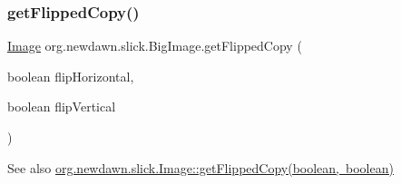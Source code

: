 \subsubsection{\texorpdfstring{get\+Flipped\+Copy()}{getFlippedCopy()}}
{\footnotesize\ttfamily \mbox{\hyperlink{classorg_1_1newdawn_1_1slick_1_1_image}{Image}} org.\+newdawn.\+slick.\+Big\+Image.\+get\+Flipped\+Copy (\begin{DoxyParamCaption}\item[{boolean}]{flip\+Horizontal,  }\item[{boolean}]{flip\+Vertical }\end{DoxyParamCaption})\hspace{0.3cm}{\ttfamily [inline]}}

\begin{DoxySeeAlso}{See also}
\mbox{\hyperlink{classorg_1_1newdawn_1_1slick_1_1_image_a60ce67f944bd70ef4ed9716974db74f1}{org.\+newdawn.\+slick.\+Image\+::get\+Flipped\+Copy(boolean, boolean)}} 
\end{DoxySeeAlso}

